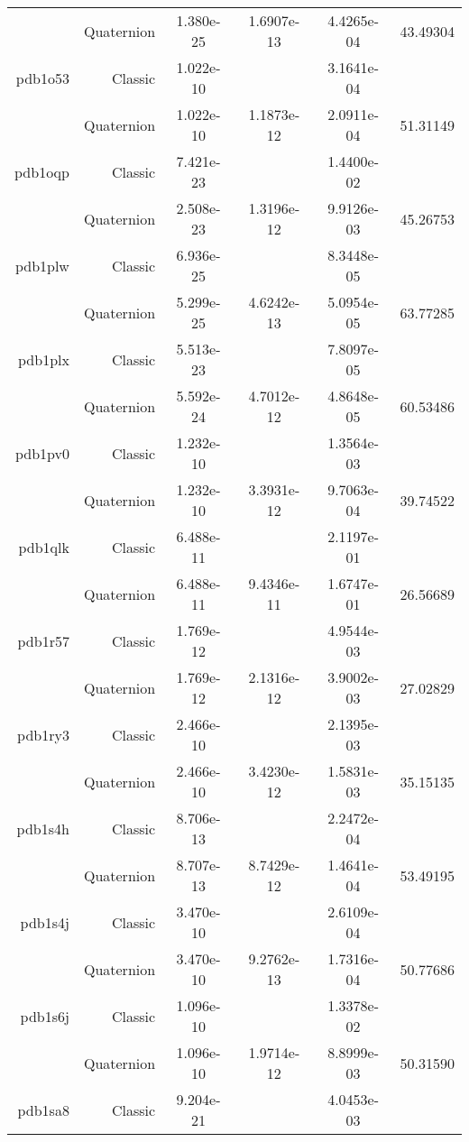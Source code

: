 \begin{xltabular}{\textwidth}{r|rS[table-format=1.3e+2]S[table-format=1.4e+2]S[table-format=1.4e+2]S[table-format=-1.5]}
& Quaternion & 1.380e-25 & 1.6907e-13 & 4.4265e-04 & 43.49304\\  \addlinespace
pdb1o53 & Classic & 1.022e-10 &  & 3.1641e-04 & \\
& Quaternion & 1.022e-10 & 1.1873e-12 & 2.0911e-04 & 51.31149\\  \addlinespace
pdb1oqp & Classic & 7.421e-23 &  & 1.4400e-02 & \\
& Quaternion & 2.508e-23 & 1.3196e-12 & 9.9126e-03 & 45.26753\\  \addlinespace
pdb1plw & Classic & 6.936e-25 &  & 8.3448e-05 & \\
& Quaternion & 5.299e-25 & 4.6242e-13 & 5.0954e-05 & 63.77285\\  \addlinespace
pdb1plx & Classic & 5.513e-23 &  & 7.8097e-05 & \\
& Quaternion & 5.592e-24 & 4.7012e-12 & 4.8648e-05 & 60.53486\\  \addlinespace
pdb1pv0 & Classic & 1.232e-10 &  & 1.3564e-03 & \\
& Quaternion & 1.232e-10 & 3.3931e-12 & 9.7063e-04 & 39.74522\\  \addlinespace
pdb1qlk & Classic & 6.488e-11 &  & 2.1197e-01 & \\
& Quaternion & 6.488e-11 & 9.4346e-11 & 1.6747e-01 & 26.56689\\  \addlinespace
pdb1r57 & Classic & 1.769e-12 &  & 4.9544e-03 & \\
& Quaternion & 1.769e-12 & 2.1316e-12 & 3.9002e-03 & 27.02829\\  \addlinespace
pdb1ry3 & Classic & 2.466e-10 &  & 2.1395e-03 & \\
& Quaternion & 2.466e-10 & 3.4230e-12 & 1.5831e-03 & 35.15135\\  \addlinespace
pdb1s4h & Classic & 8.706e-13 &  & 2.2472e-04 & \\
& Quaternion & 8.707e-13 & 8.7429e-12 & 1.4641e-04 & 53.49195\\  \addlinespace
pdb1s4j & Classic & 3.470e-10 &  & 2.6109e-04 & \\
& Quaternion & 3.470e-10 & 9.2762e-13 & 1.7316e-04 & 50.77686\\  \addlinespace
pdb1s6j & Classic & 1.096e-10 &  & 1.3378e-02 & \\
& Quaternion & 1.096e-10 & 1.9714e-12 & 8.8999e-03 & 50.31590\\  \addlinespace
pdb1sa8 & Classic & 9.204e-21 &  & 4.0453e-03 & \\

\end{xltabular}
